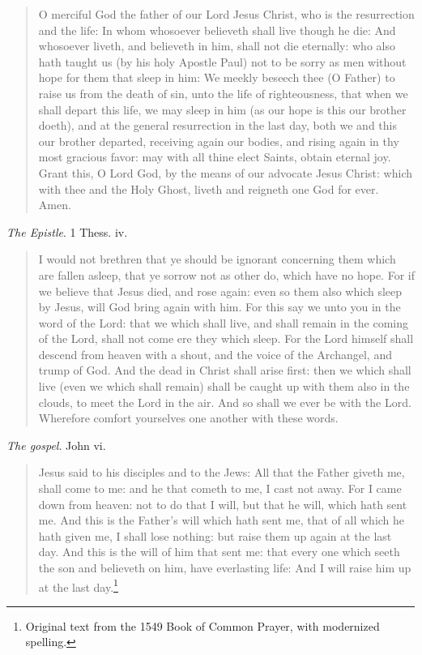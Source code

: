 \documentclass[
]{book}
\begin{document}
\begin{quote}
O merciful God the father of our Lord Jesus Christ, who is the resurrection and the life: In whom whosoever believeth shall live though he die: And whosoever liveth, and believeth in him, shall not die eternally: who also hath taught us (by his holy Apostle Paul) not to be sorry as men without hope for them that sleep in him: We meekly beseech thee (O Father) to raise us from the death of sin, unto the life of righteousness, that when we shall depart this life, we may sleep in him (as our hope is this our brother doeth), and at the general resurrection in the last day, both we and this our brother departed, receiving again our bodies, and rising again in thy most gracious favor: may with all thine elect Saints, obtain eternal joy. Grant this, O Lord God, by the means of our advocate Jesus Christ: which with thee and the Holy Ghost, liveth and reigneth one God for ever. Amen.
\end{quote}

\begin{center}
\emph{The Epistle}. 1 Thess. iv.

\end{center}

\begin{quote}
I would not brethren that ye should be ignorant concerning them which are fallen asleep, that ye sorrow not as other do, which have no hope. For if we believe that Jesus died, and rose again: even so them also which sleep by Jesus, will God bring again with him. For this say we unto you in the word of the Lord: that we which shall live, and shall remain in the coming of the Lord, shall not come ere they which sleep. For the Lord himself shall descend from heaven with a shout, and the voice of the Archangel, and trump of God. And the dead in Christ shall arise first: then we which shall live (even we which shall remain) shall be caught up with them also in the clouds, to meet the Lord in the air. And so shall we ever be with the Lord. Wherefore comfort yourselves one another with these words.
\end{quote}

\begin{center}
\emph{The gospel}. John vi.

\end{center}

\begin{quote}
Jesus said to his disciples and to the Jews: All that the Father giveth me, shall come to me: and he that cometh to me, I cast not away. For I came down from heaven: not to do that I will, but that he will, which hath sent me. And this is the Father's will which hath sent me, that of all which he hath given me, I shall lose nothing: but raise them up again at the last day. And this is the will of him that sent me: that every one which seeth the son and believeth on him, have everlasting life: And I will raise him up at the last day.\footnote{Original text from the 1549 Book of Common Prayer, with modernized spelling.}
\end{quote}
\end{document}
